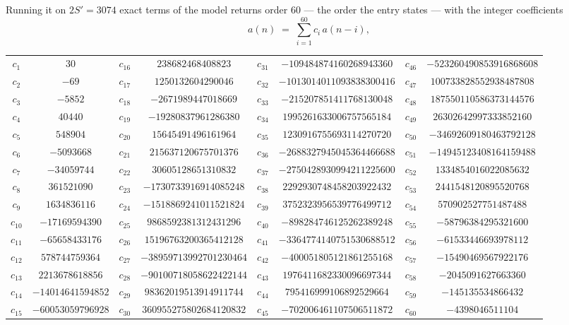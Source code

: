 \documentclass[11pt,a4paper]{article}
\theoremstyle{plain}
\theoremstyle{definition}
\begin{document}
Running it on $2S'=3074$ exact terms of the model returns order $60$ --- the order the
entry states --- with the integer coefficients
\[
a(n)\;=\;\sum_{i=1}^{60}c_i\,a(n-i),
\]
\begin{center}\small
\begin{tabular}{cccccccc}
$c_{1}$ & $30$ & $c_{16}$ & $238682468408823$ & $c_{31}$ & $-109484874160268943360$ & $c_{46}$ & $-523260490853916868608$ \\
$c_{2}$ & $-69$ & $c_{17}$ & $1250132604290046$ & $c_{32}$ & $-1013014011093838300416$ & $c_{47}$ & $100733828552938487808$ \\
$c_{3}$ & $-5852$ & $c_{18}$ & $-2671989447018669$ & $c_{33}$ & $-215207851411768130048$ & $c_{48}$ & $187550110586373144576$ \\
$c_{4}$ & $40440$ & $c_{19}$ & $-19280837961286380$ & $c_{34}$ & $1995261633006757565184$ & $c_{49}$ & $26302642997333852160$ \\
$c_{5}$ & $548904$ & $c_{20}$ & $15645491496161964$ & $c_{35}$ & $1230916755693114270720$ & $c_{50}$ & $-34692609180463792128$ \\
$c_{6}$ & $-5093668$ & $c_{21}$ & $215637120675701376$ & $c_{36}$ & $-2688327945045364466688$ & $c_{51}$ & $-14945123408164159488$ \\
$c_{7}$ & $-34059744$ & $c_{22}$ & $30605128651310832$ & $c_{37}$ & $-2750428930994211225600$ & $c_{52}$ & $1334854016022085632$ \\
$c_{8}$ & $361521090$ & $c_{23}$ & $-1730733916914085248$ & $c_{38}$ & $2292930748458203922432$ & $c_{53}$ & $2441548120895520768$ \\
$c_{9}$ & $1634836116$ & $c_{24}$ & $-1518869241011521824$ & $c_{39}$ & $3752323956539776499712$ & $c_{54}$ & $570902527751487488$ \\
$c_{10}$ & $-17169594390$ & $c_{25}$ & $9868592381312431296$ & $c_{40}$ & $-898284746125262389248$ & $c_{55}$ & $-58796384295321600$ \\
$c_{11}$ & $-65658433176$ & $c_{26}$ & $15196763200365412128$ & $c_{41}$ & $-3364774140751530688512$ & $c_{56}$ & $-61533446693978112$ \\
$c_{12}$ & $578744759364$ & $c_{27}$ & $-38959713992701230464$ & $c_{42}$ & $-400051805121861255168$ & $c_{57}$ & $-15490469567922176$ \\
$c_{13}$ & $2213678618856$ & $c_{28}$ & $-90100718058622422144$ & $c_{43}$ & $1976411682330096697344$ & $c_{58}$ & $-2045091627663360$ \\
$c_{14}$ & $-14014641594852$ & $c_{29}$ & $98362019513914911744$ & $c_{44}$ & $795416999106892529664$ & $c_{59}$ & $-145135534866432$ \\
$c_{15}$ & $-60053059796928$ & $c_{30}$ & $360955275802684120832$ & $c_{45}$ & $-702006461107506511872$ & $c_{60}$ & $-4398046511104$ \\
\end{tabular}
\end{center}
\end{document}
